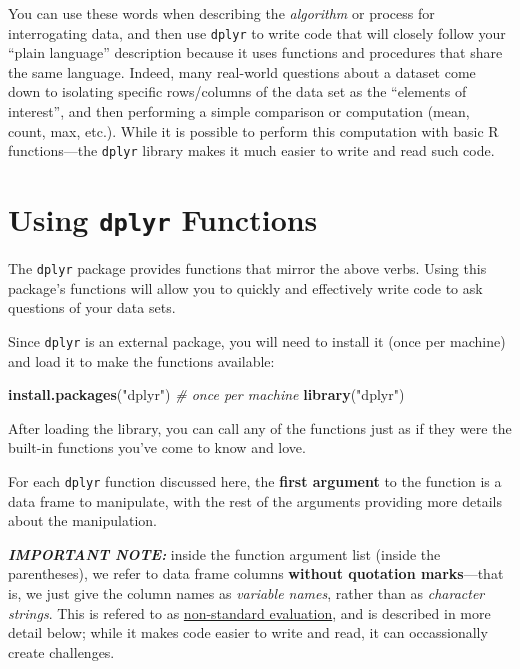 \documentclass[]{book}
\newenvironment{Shaded}{\begin{snugshade}}{\end{snugshade}}
\newcommand{\KeywordTok}[1]{\textcolor[rgb]{0.13,0.29,0.53}{\textbf{#1}}}
\newcommand{\StringTok}[1]{\textcolor[rgb]{0.31,0.60,0.02}{#1}}
\newcommand{\CommentTok}[1]{\textcolor[rgb]{0.56,0.35,0.01}{\textit{#1}}}
\newcommand{\NormalTok}[1]{#1}
\theoremstyle{definition}
\theoremstyle{definition}
\theoremstyle{remark}
\begin{document}
You can use these words when describing the \emph{algorithm} or process
for interrogating data, and then use \texttt{dplyr} to write code that
will closely follow your ``plain language'' description because it uses
functions and procedures that share the same language. Indeed, many
real-world questions about a dataset come down to isolating specific
rows/columns of the data set as the ``elements of interest'', and then
performing a simple comparison or computation (mean, count, max, etc.).
While it is possible to perform this computation with basic R
functions---the \texttt{dplyr} library makes it much easier to write and
read such code.

\section{\texorpdfstring{Using \texttt{dplyr}
Functions}{Using dplyr Functions}}\label{using-dplyr-functions}

The \texttt{dplyr} package provides functions that mirror the above
verbs. Using this package's functions will allow you to quickly and
effectively write code to ask questions of your data sets.

Since \texttt{dplyr} is an external package, you will need to install it
(once per machine) and load it to make the functions available:

\begin{Shaded}
\begin{Highlighting}[]
\KeywordTok{install.packages}\NormalTok{(}\StringTok{"dplyr"}\NormalTok{)  }\CommentTok{# once per machine}
\KeywordTok{library}\NormalTok{(}\StringTok{"dplyr"}\NormalTok{)}
\end{Highlighting}
\end{Shaded}

After loading the library, you can call any of the functions just as if
they were the built-in functions you've come to know and love.

For each \texttt{dplyr} function discussed here, the \textbf{first
argument} to the function is a data frame to manipulate, with the rest
of the arguments providing more details about the manipulation.

\textbf{\emph{IMPORTANT NOTE:}} inside the function argument list
(inside the parentheses), we refer to data frame columns \textbf{without
quotation marks}---that is, we just give the column names as
\emph{variable names}, rather than as \emph{character strings}. This is
refered to as
\protect\hyperlink{Non-standardux5cux2520Evaluation}{non-standard
evaluation}, and is described in more detail below; while it makes code
easier to write and read, it can occassionally create challenges.
\end{document}
